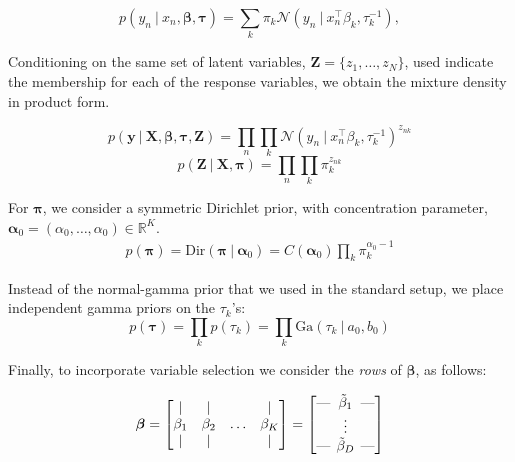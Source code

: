 \documentclass[twoside,11pt]{article}
\newcommand\given[1][]{\:#1\vert\:}
\newcommand{\transpose}[1]{#1^{\intercal}}
\newcommand{\R}{\mathbb{R}}
\newcommand{\nprod}{\prod\limits_{n}}
\newcommand{\kprod}{\prod\limits_{k}}
\newcommand{\ksum}{\sum\limits_{k}}
\newcommand{\boldbeta}{\boldsymbol\beta}
\newcommand{\boldtau}{\boldsymbol\tau}
\newcommand{\pr}[1]{p \left( #1 \right)}
\begin{document}
\begin{equation} 
	 \pr{y_n \given x_n, \boldbeta, \boldtau} = \ksum \pi_k \mathcal{N} \left( y_n \given \transpose{x_n}\beta_k, \tau_k^{-1} \right), 
\end{equation}


Conditioning on the same set of latent variables, $\mathbf{Z} = \{ z_1, \ldots, z_N \}$, used indicate the membership for each of the response variables, we obtain the mixture density in product form. 

\begin{equation} 
	p \left( \mathbf{y} \given \mathbf{X}, \boldsymbol\beta, \boldsymbol{\tau}, \mathbf{Z} \right) = 
	\prod_{n} \prod_{k} \mathcal{N} \left( y_n \given \transpose{x_n} \beta_k, \tau_{k}^{-1} \right)^{z_{nk}}
\end{equation}
\begin{equation} 
	p \left( \mathbf{Z} \given \mathbf{X}, \boldsymbol \pi \right) = \nprod \kprod \pi_{k}^{z_{nk}} 
\end{equation}

For $\boldsymbol \pi$, we consider a symmetric Dirichlet prior, with concentration parameter, $\boldsymbol \alpha_0 = \left( \alpha_0, \ldots, \alpha_0 \right) \in \R^K$. 
\begin{equation}
\begin{split}
	 p(\boldsymbol \pi) = \mathrm{Dir} \left( \boldsymbol \pi \given \boldsymbol \alpha_0 \right) = C(\boldsymbol\alpha_0) \kprod \pi_k^{\alpha_0 - 1}
\end{split}
\end{equation}

Instead of the normal-gamma prior that we used in the standard setup, we place independent gamma priors on the $\tau_k$'s: 
\begin{equation}
	p(\boldtau) = \kprod p(\tau_k) = \kprod \mathrm{Ga} \left( \tau_k \given a_0, b_0 \right)
\end{equation}



Finally, to incorporate variable selection we consider the \textit{rows} of $\boldbeta$, as follows:

\[
\boldbeta = 
\begin{bmatrix}
    \vert &    \vert   &   &\vert\\
    \beta_1  & \beta_2 &   \ldots & \beta_K\\
    \vert &     \vert  &    &\vert
\end{bmatrix}
= 
\begin{bmatrix}
    \text{---} \hspace{-0.2cm} & \tilde{\beta}_1 & \hspace{-0.2cm} \text{---} \\
    \text{   } \hspace{-0.2cm} & \vdots          & \hspace{-0.2cm} \text{   } \\
    \text{---} \hspace{-0.2cm} & \tilde{\beta}_D & \hspace{-0.2cm} \text{---}
\end{bmatrix}
\]
\end{document}
